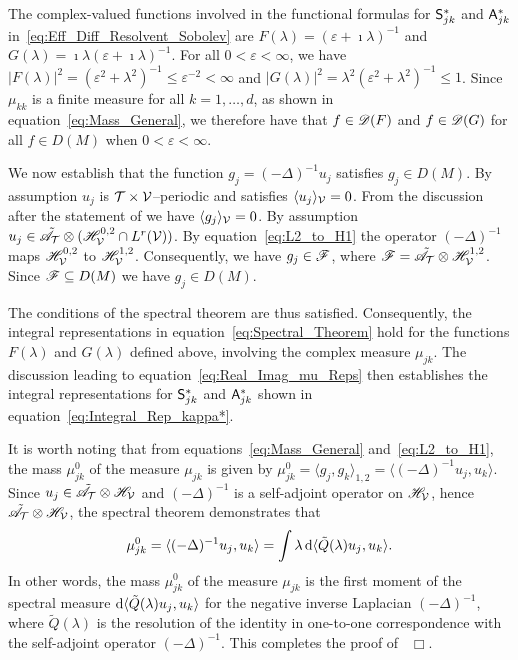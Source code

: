 \documentclass[amsa]{ipart}
\begin{document}
The
complex-valued functions involved in the functional formulas for
$\mathsf{S}^*_{jk}$ and $\mathsf{A}^*_{jk}$ in~\eqref{eq:Eff_Diff_Resolvent_Sobolev}
are $F(\lambda)=(\varepsilon+\imath\lambda)^{-1}$ and $G(\lambda)=\imath\lambda(\varepsilon+\imath\lambda)^{-1}$. For all $0<\varepsilon<\infty$, 
we have $|F(\lambda)|^2=(\varepsilon^2+\lambda^2)^{-1}\leq\varepsilon^{-2}<\infty$ and 
$|G(\lambda)|^2=\lambda^2(\varepsilon^2+\lambda^2)^{-1}\leq 1$. Since $\mu_{kk}$ is a finite measure
for all $k=1,\ldots,d$, as shown in equation~\eqref{eq:Mass_General}, we
therefore have 
that $f\in\mathscr{D}(F)$ and $f\in\mathscr{D}(G)$ for all $f\in D(M)$ when $0<\varepsilon<\infty$.



We now establish that the function $g_j=(-\Delta)^{-1}u_j$ satisfies $g_j\in
D(M)$.  By assumption $u_j$ is $\mathcal{T}\times\mathcal{V}$--periodic and satisfies $\langle
u_j\rangle_{\mathcal{V}}=0$. From the discussion after the statement of 
 we have $\langle g_j\rangle_{\mathcal{V}}=0$. By assumption
$u_j\in\tilde{\mathscr{A}}_{\mathcal{T}}\otimes (\mathscr{H}^{0,2}_{\mathcal{V}}\cap L^r(\mathcal{V}))$. By
equation~\eqref{eq:L2_to_H1} the 
operator $(-\Delta)^{-1}$ maps $\mathscr{H}^{0,2}_{\mathcal{V}}$ to
$\mathscr{H}^{1,2}_{\mathcal{V}}$. Consequently, we have 
$g_j\in\mathscr{F}$, where $\mathscr{F}=\tilde{\mathscr{A}}_{\mathcal{T}}\otimes\mathscr{H}^{1,2}_{\mathcal{V}}$. Since $\mathscr{F}\subseteq
D(M)$ we have $g_j\in D(M)$.  


The conditions of the
spectral theorem are thus satisfied. Consequently, the integral
representations in equation~\eqref{eq:Spectral_Theorem} hold for the
functions $F(\lambda)$ and $G(\lambda)$ defined above, involving the complex
measure $\mu_{jk}$. The discussion leading to
equation~\eqref{eq:Real_Imag_mu_Reps} then establishes the integral
representations for $\mathsf{S}^*_{jk}$ and $\mathsf{A}^*_{jk}$ shown in
equation~\eqref{eq:Integral_Rep_kappa*}. 




It is worth noting that from
equations~\eqref{eq:Mass_General} and~\eqref{eq:L2_to_H1}, the mass 
$\mu_{jk}^0$ of the measure $\mu_{jk}$ is given by
$\mu_{jk}^0=\langle g_j,g_k\rangle_{1,2}=\langle(-\Delta)^{-1}u_j,u_k\rangle$. Since
$u_j\in\tilde{\mathscr{A}}_{\mathcal{T}}\otimes\mathscr{H}_{\mathcal{V}}$ and $(-\Delta)^{-1}$ is a
self-adjoint operator on $\mathscr{H}_{\mathcal{V}}$, hence
$\tilde{\mathscr{A}}_{\mathcal{T}}\otimes\mathscr{H}_{\mathcal{V}}$, the spectral theorem demonstrates
that    
%
\begin{align}\label{eq:Laplacian_moment}
  \mu_{jk}^0=\langle(-\Delta)^{-1}u_j,u_k\rangle=\int\lambda\,\d\langle\tilde{Q}(\lambda)u_j,u_k\rangle.
\end{align}
%
In other words, the mass $\mu_{jk}^0$ of the measure $\mu_{jk}$ is the
first moment of the spectral measure $\mathrm{d}\langle\tilde{Q}(\lambda)u_j,u_k\rangle$ for 
the negative inverse Laplacian $(-\Delta)^{-1}$, where $\tilde{Q}(\lambda)$ is
the resolution of the identity in one-to-one correspondence with the 
self-adjoint operator $(-\Delta)^{-1}$. This completes the proof
of~ $\Box$.  
\end{document}
